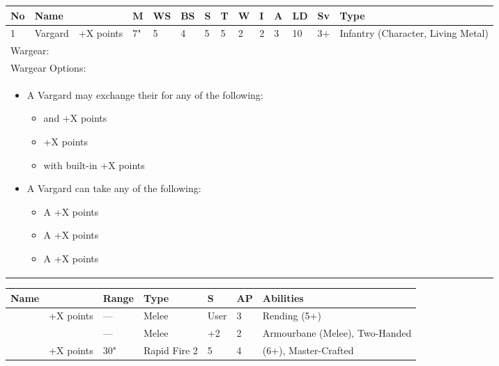 \noindent
\begin{tabular}{||m{10pt} m{90pt} m{30pt} m{11pt} m{11pt} m{11pt} m{11pt} m{11pt} m{11pt} m{11pt} m{11pt} m{11pt} m{11pt} m{135pt}||}
	\hline
	No & Name & & M & WS & BS & S & T & W & I & A & LD & Sv & Type \\
	\hline
	1 & Vargard & +X points & 7" & 5 & 4 & 5 & 5 & 2 & 2 & 3 & 10 & 3+ & Infantry (Character, Living Metal)\\
	\hline
	\hline
	\multicolumn{14}{||Z{532 pt}||}{Wargear: \quickref{Warscythe}}\\
	\multicolumn{14}{||Z{532 pt}||}{Wargear Options:} \\		
	\multicolumn{14}{||Z{532 pt}||}{\begin{itemize}
			\item A Vargard may exchange their \quickref{Warscythe} for any of the following:
			\begin{itemize}
				\item \quickref{Hyperphase Sword} and \quickref{Dispersion Shield}\hrulefill +X points
				\item \quickref{Relic Gauss Blaster} \hrulefill +X points
				\item \quickref{Warscythe} with built-in \quickref{Relic Gauss Blaster} \hrulefill +X points
			\end{itemize}\item A Vargard can take any of the following:
			\begin{itemize}
				\item A \quickref{Phase Shifter} \hrulefill +X points
				\item A \quickref{Phylactery} \hrulefill +X points
				\item A \quickref{Sempiternal Weave} \hrulefill +X points
			\end{itemize}
	\end{itemize}} \\	
	\hline
\end{tabular}

\noindent
\begin{tabular}{||m{110pt} m{30pt} m{31pt} m{55pt} m{12pt} m{12pt} m{210pt}||}
	\hline
	Name & & Range & Type & S & AP & Abilities \\
	\hline
	\quickref{Hyperphase Sword} & +X points & — & Melee & User & 3 & Rending (5+) \\
	\quickref{Warscythe} & & — & Melee & +2 & 2 & Armourbane (Melee), Two-Handed \\
	\quickref{Relic Gauss Blaster} & +X points & 30" & Rapid Fire 2 & 5 & 4 & \quickref{Gauss} (6+), Master-Crafted \\	
	\hline
\end{tabular}

